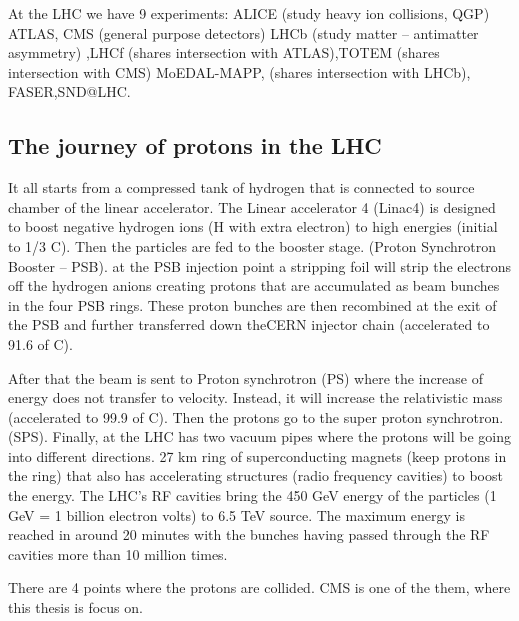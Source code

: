 At the LHC we have 9 experiments: 
ALICE (study heavy ion collisions, QGP) ATLAS, CMS  (general purpose detectors) LHCb (study matter – antimatter asymmetry) ,LHCf (shares intersection with ATLAS),TOTEM (shares intersection with CMS) MoEDAL-MAPP, (shares intersection with LHCb), FASER,SND@LHC.

\subsection{The journey of protons in the LHC}

It all starts from a compressed tank of hydrogen that is connected to source chamber of the linear accelerator.
The Linear accelerator 4 (Linac4) is designed to boost negative hydrogen ions (H with extra electron) to high energies (initial to 1/3 C).
Then the particles are fed to the booster stage. (Proton Synchrotron Booster – PSB).
at the PSB injection point a stripping foil will strip the electrons off the hydrogen anions creating protons that are accumulated as beam bunches in the four PSB rings.
These proton bunches are then recombined at the exit of the PSB and further transferred down theCERN injector chain (accelerated to 91.6 of C).

After that the beam is sent to Proton synchrotron (PS) where the increase of energy does not transfer to velocity.
Instead, it will increase the relativistic mass (accelerated to 99.9 of C).
Then the protons go to the super proton synchrotron. (SPS). Finally, at the LHC has two vacuum pipes where the protons will be going into different directions. 27 km ring of superconducting magnets (keep protons in the ring) that also has accelerating structures (radio frequency cavities) to boost the energy. The LHC’s RF cavities bring the 450 GeV energy of the particles (1 GeV = 1 billion electron volts) to 6.5 TeV source.
The maximum energy is reached in around 20 minutes with the bunches having passed through the RF cavities more than 10 million times.   

There are 4 points where the protons are collided. CMS is one of the them, where this thesis is focus on.  

